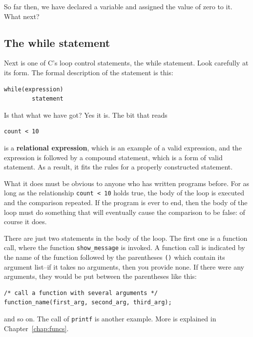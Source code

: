    So far then, we have declared a variable and assigned the value of zero
    to it. What next?


  

  \subsection{The while statement}
   

   Next is one of C's loop control statements, the while statement. Look
    carefully at its form. The formal description of the \while{}
    statement is this:


   \begin{Verbatim}
while(expression)
        statement
\end{Verbatim}

   Is that what we have got? Yes it is. The bit that reads


   \begin{Verbatim}
count < 10
\end{Verbatim}

   is a \textbf{relational expression}, which is an example of a valid
    expression, and the expression is followed by a compound statement, which
    is a form of valid statement. As a result, it fits the rules for a properly
    constructed \while{} statement.


   What it does must be obvious to anyone who has written programs
    before. For as long as the relationship \texttt{count < 10} holds
    true, the body of the loop is executed and the comparison repeated. If the
    program is ever to end, then the body of the loop must do something that
    will eventually cause the comparison to be false: of course it does.


   There are just two statements in the body of the loop. The first one is a
    function call, where the function \texttt{show\_message} is invoked. A
    function call is indicated by the name of the function followed by the
    parentheses \texttt{()} which contain its argument list--if it
    takes no arguments, then you provide none. If there were any arguments,
    they would be put between the parentheses like this:


   \begin{Verbatim}
/* call a function with several arguments */
function_name(first_arg, second_arg, third_arg);
\end{Verbatim}

and so on. The call of \texttt{printf} is another example.
More is explained in Chapter~\ref{chap:funcs}.


